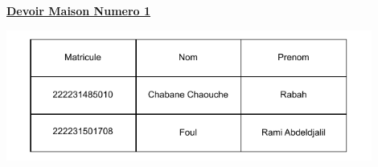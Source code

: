 \documentclass[fleqn]{article}
\begin{document}
\renewcommand{\arrayrulewidth}{0.75mm} %
\setlength{\tabcolsep}{12pt} %
\renewcommand{\arraystretch}{1.5} %

\begin{center}
    \Huge{\textbf{\underline{Devoir Maison Numero 1}}}
\end{center}

\vspace{1cm}

\begin{center}
    \includegraphics[width=0.9\textwidth]{Parts/bi.drawio.pdf}
\end{center}




\end{document}
